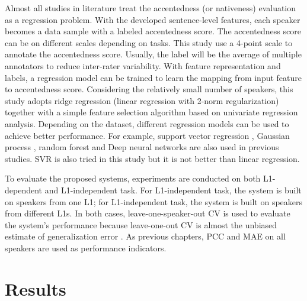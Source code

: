 Almost all studies in literature treat the accentedness (or nativeness) evaluation as a regression problem. With the developed sentence-level features, each speaker becomes a data sample with a labeled accentedness score. The accentedness score can be on different scales depending on tasks. This study use a 4-point scale to annotate the accentedness score. Usually, the label will be the average of multiple annotators to reduce inter-rater variability. With feature representation and labels, a regression model can be trained to learn the mapping from input feature to accentedness score. Considering the relatively small number of speakers, this study adopts ridge regression (linear regression with 2-norm regularization) together with a simple feature selection algorithm based on univariate regression analysis. Depending on the dataset, different regression models can be used to achieve better performance. For example, support vector regression \citep{black2015automated}, Gaussian process \citep{grosz2015assessing}, random forest \citep{qian2017bidirectional} and Deep neural networks \citep{grosz2015assessing} are also used in previous studies. SVR is also tried in this study but it is not better than linear regression.

To evaluate the proposed systems, experiments are conducted on both L1-dependent and L1-independent task. For L1-independent task, the system is built on speakers from one L1; for L1-independent task, the system is built on speakers from different L1s. In both cases, leave-one-speaker-out CV is used to evaluate the system's performance because leave-one-out CV is almost the unbiased estimate of generalization error \citep{elisseeff2003leave}. As previous chapters, PCC and MAE on all speakers are used as performance indicators. 

\section{Results}

